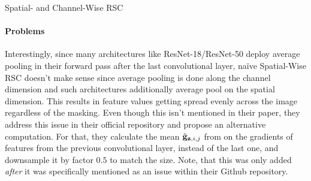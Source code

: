 \begin{algorithm}[t]
    \SetAlgoLined
    \SetNoFillComment
    \BlankLine
\caption{Spatial- and Channel-Wise RSC}
\label{alg:SpatialRSC}
\end{algorithm}


\paragraph{Problems}
Interestingly, since many architectures like ResNet-18/ResNet-50 deploy average pooling in their forward pass after the last convolutional layer, na\"ive Spatial-Wise RSC doesn't make sense since average pooling is done along the channel dimension and such architectures additionally average pool on the spatial dimension. This results in feature values getting spread evenly across the image regardless of the masking. Even though this isn't mentioned in their paper, they address this issue in their official repository and propose an alternative computation. For that, they calculate the mean $\Tilde{\mathbf{g}}_{\mathbf{z}, i, j}$ from  on the gradients of features from the previous convolutional layer, instead of the last one, and downsample it by factor $0.5$ to match the size. Note, that this was only added \emph{after} it was specifically mentioned as an issue within their Github repository. 

